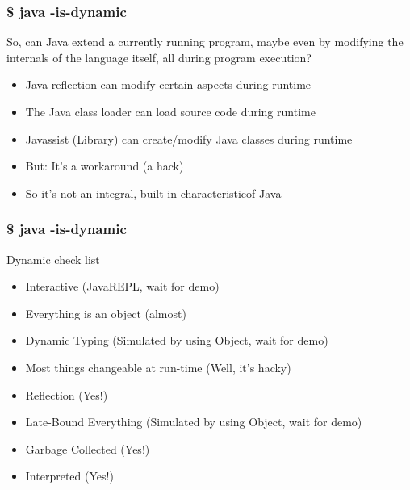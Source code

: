 \begin{frame}
  \frametitle{\$ java -is-dynamic}
  \center
  So, can Java \frqq extend a currently running program\flqq, maybe \frqq even by modifying the internals of the language itself, all during program execution\flqq ?

  \vspace{0.25cm}
  \begin{itemize}
    \item Java reflection can modify certain aspects during runtime
    \vspace{0.4cm} 
    \item The Java class loader can load source code during runtime
    \vspace{0.4cm}      
    \item Javassist (Library) can create/modify Java classes during runtime
    \vspace{0.4cm}    
    \item But: It's a workaround (a hack)
    \vspace{0.4cm}
    \item So it's not an \frqq integral, built-in characteristic\flqq of Java
  \end{itemize}
\end{frame}

\begin{frame}
  \frametitle{\$ java -is-dynamic}

  Dynamic check list
  \vspace{0.25cm}
  \begin{itemize}
    \item Interactive (JavaREPL, wait for demo)
    \vspace{0.4cm} 
    \item Everything is an object (almost)
    \vspace{0.4cm}      
    \item Dynamic Typing (Simulated by using Object, wait for demo)
    \vspace{0.4cm}    
    \item Most things changeable at run-time (Well, it's hacky)
    \vspace{0.4cm}
    \item Reflection (Yes!)
    \vspace{0.4cm}
    \item Late-Bound Everything (Simulated by using Object, wait for demo)
    \vspace{0.4cm}
    \item Garbage Collected (Yes!)
    \vspace{0.4cm}
    \item Interpreted (Yes!)
  \end{itemize}
\end{frame}

